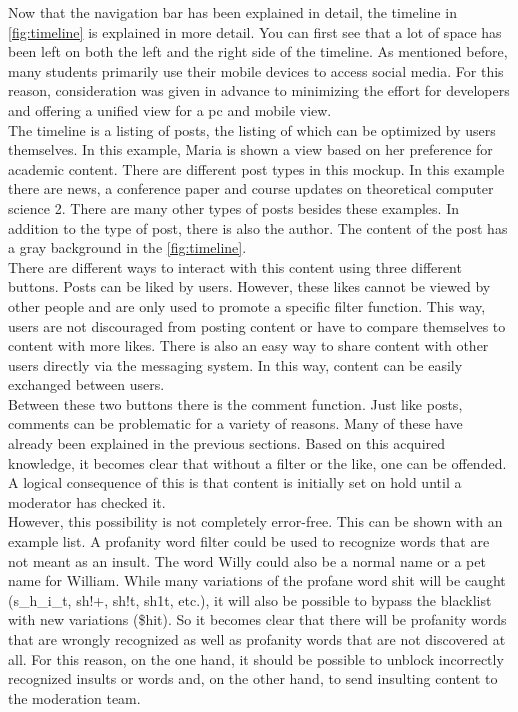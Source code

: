 Now that the navigation bar has been explained in detail, the timeline in \autoref{fig:timeline} is explained in more detail.
You can first see that a lot of space has been left on both the left and the right side of the timeline.
As mentioned before, many students primarily use their mobile devices to access social media.
For this reason, consideration was given in advance to minimizing the effort for developers and offering a unified view for a pc and mobile view.\\

The timeline is a listing of posts, the listing of which can be optimized by users themselves.
In this example, Maria is shown a view based on her preference for academic content.
There are different post types in this mockup.
In this example there are news, a conference paper and course updates on theoretical computer science 2.
There are many other types of posts besides these examples.
In addition to the type of post, there is also the author.
The content of the post has a gray background in the \autoref{fig:timeline}.\\

There are different ways to interact with this content using three different buttons.
Posts can be liked by users.
However, these likes cannot be viewed by other people and are only used to promote a specific filter function.
This way, users are not discouraged from posting content or have to compare themselves to content with more likes.
There is also an easy way to share content with other users directly via the messaging system.
In this way, content can be easily exchanged between users.\\

Between these two buttons there is the comment function.
Just like posts, comments can be problematic for a variety of reasons.
Many of these have already been explained in the previous sections.
Based on this acquired knowledge, it becomes clear that without a filter or the like, one can be offended.
A logical consequence of this is that content is initially set on hold until a moderator has checked it.\\

However, this possibility is not completely error-free.
This can be shown with an example list\cite{profanity-list}.
A profanity word filter could be used to recognize words that are not meant as an insult.
The word Willy could also be a normal name or a pet name for William.
While many variations of the profane word shit will be caught (s\_h\_i\_t, sh!+, sh!t, sh1t, etc.), it will also be possible to bypass the blacklist with new variations (\$hit).
So it becomes clear that there will be profanity words that are wrongly recognized as well as profanity words that are not discovered at all.
For this reason, on the one hand, it should be possible to unblock incorrectly recognized insults or words and, on the other hand, to send insulting content to the moderation team.\\

